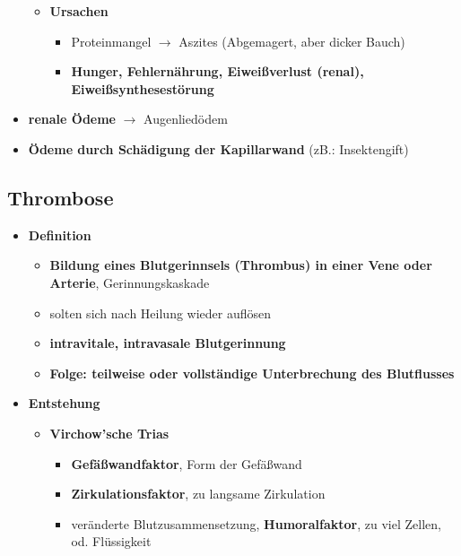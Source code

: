 \begin{itemize}
\begin{itemize}
				\item \textbf{Ursachen}
					\begin{itemize}
						\item Proteinmangel $\rightarrow$ Aszites (Abgemagert, aber dicker Bauch)
						\item \textbf{Hunger, Fehlernährung, Eiweißverlust (renal), Eiweißsynthesestörung}
					\end{itemize}
			\end{itemize}
		\item \textbf{renale Ödeme} $\rightarrow$ Augenliedödem
		\item \textbf{Ödeme durch Schädigung der Kapillarwand} (zB.: Insektengift)
	\end{itemize}
	
\subsection{Thrombose}
	\begin{itemize}
		\item \textbf{Definition}
			\begin{itemize}
				\item \textbf{Bildung eines Blutgerinnsels (Thrombus) in einer Vene oder Arterie}, Gerinnungskaskade
				\item solten sich nach Heilung wieder auflösen
				\item \textbf{intravitale, intravasale Blutgerinnung}
				\item \textbf{Folge: teilweise oder vollständige Unterbrechung des Blutflusses}
			\end{itemize}
		\item \textbf{Entstehung}
			\begin{itemize}
				\item \textbf{Virchow'sche Trias}
					\begin{itemize}
						\item \textbf{Gefäßwandfaktor}, Form der Gefäßwand
						\item \textbf{Zirkulationsfaktor}, zu langsame Zirkulation
						\item veränderte Blutzusammensetzung, \textbf{Humoralfaktor}, zu viel Zellen, od. Flüssigkeit
					\end{itemize}
			\end{itemize}
	\end{itemize}
	
